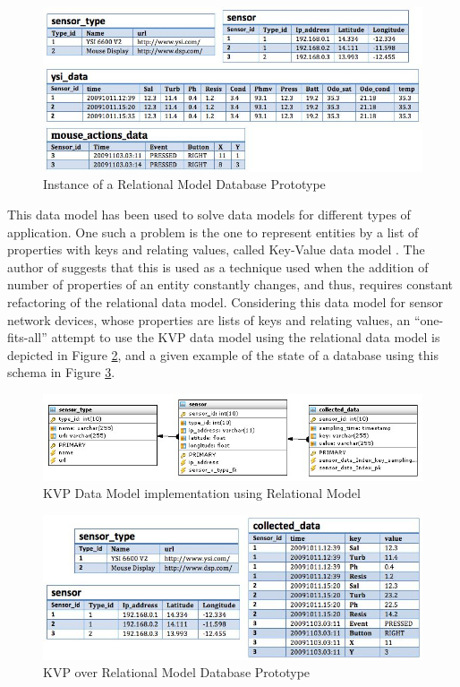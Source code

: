 \begin{figure}[!h]
  \centering
  \includegraphics[scale=0.7]{../diagrams/persistence-example-relational}
  \caption{Instance of a Relational Model Database Prototype}
  \label{fig:persistence-example-relational}
\end{figure}

This data model has been used to solve data models for different types of
application. One such a problem is the one to represent entities by a list of
properties with keys and relating values, called Key-Value data model
\cite{db-kvp-in-relational01, db-kvp-in-relational02}. The author of
\cite{db-kvp-in-relational01} suggests that this is used as a technique used
when the addition of number of properties of an entity constantly changes, and
thus, requires constant refactoring of the relational data model. Considering
this data model for sensor network devices, whose properties are lists of keys
and relating values, an ``one-fits-all'' attempt to use the KVP data model
using the relational data model is depicted in Figure
\ref{fig:KVP-on-Relational-Model}, and a given example of the state of a
database using this schema in Figure
\ref{fig:persistence-example-relational-kvp}.

\begin{figure}[!h]
  \centering
  \includegraphics[scale=0.6]{../diagrams/KVP-on-Relational-Model}
  \caption{KVP Data Model implementation using Relational Model}
  \label{fig:KVP-on-Relational-Model}
\end{figure}

\begin{figure}[!h]
  \centering
  \includegraphics[scale=0.75]{../diagrams/persistence-example-relational-kvp}
  \caption{KVP over Relational Model Database Prototype}
  \label{fig:persistence-example-relational-kvp}
\end{figure}

